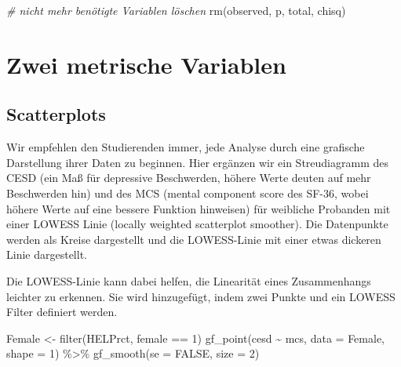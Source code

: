 \documentclass[
  ngerman,
]{scrbook}
\newenvironment{Shaded}{\begin{snugshade}}{\end{snugshade}}
\newcommand{\AttributeTok}[1]{\textcolor[rgb]{0.77,0.63,0.00}{#1}}
\newcommand{\CommentTok}[1]{\textcolor[rgb]{0.56,0.35,0.01}{\textit{#1}}}
\newcommand{\ConstantTok}[1]{\textcolor[rgb]{0.00,0.00,0.00}{#1}}
\newcommand{\DecValTok}[1]{\textcolor[rgb]{0.00,0.00,0.81}{#1}}
\newcommand{\FunctionTok}[1]{\textcolor[rgb]{0.00,0.00,0.00}{#1}}
\newcommand{\NormalTok}[1]{#1}
\newcommand{\OtherTok}[1]{\textcolor[rgb]{0.56,0.35,0.01}{#1}}
\newcommand{\SpecialCharTok}[1]{\textcolor[rgb]{0.00,0.00,0.00}{#1}}
\newenvironment{note}[1]
  {
  \begin{itemize}
  \renewcommand{\labelitemi}{
    \raisebox{-.01\height}[0pt][0pt]{
      {\setkeys{Gin}{width=7em,keepaspectratio}
        {\normalsize \textcolor{dark-fom-green}\faHashtag}}
        }
  }
  \begin{blackbox}
   \item
    }
    {
  \end{blackbox}
  \end{itemize}
  }
\begin{document}
\begin{Shaded}
\begin{Highlighting}[]
\CommentTok{\# nicht mehr benötigte Variablen löschen}
\FunctionTok{rm}\NormalTok{(observed, p, total, chisq)}
\end{Highlighting}
\end{Shaded}

\hypertarget{zweiMetrVar}{%
\chapter{Zwei metrische Variablen}\label{zweiMetrVar}}

\hypertarget{scatterplots}{%
\section{Scatterplots}\label{scatterplots}}

Wir empfehlen den Studierenden immer, jede Analyse durch eine grafische Darstellung ihrer Daten zu beginnen. Hier ergänzen wir ein Streudiagramm des CESD (ein Maß für depressive Beschwerden, höhere Werte deuten auf mehr Beschwerden hin) und des MCS (mental component score des SF-36, wobei höhere Werte auf eine bessere Funktion hinweisen) für weibliche Probanden mit einer LOWESS Linie (locally weighted scatterplot smoother). Die Datenpunkte werden als Kreise dargestellt und die LOWESS-Linie mit einer etwas dickeren Linie dargestellt.

\begin{note}{note}
Die LOWESS-Linie kann dabei helfen, die Linearität eines Zusammenhangs leichter zu erkennen. Sie wird hinzugefügt, indem zwei Punkte und ein LOWESS Filter definiert werden.

\end{note}

\begin{Shaded}
\begin{Highlighting}[]
\NormalTok{Female }\OtherTok{\textless{}{-}} \FunctionTok{filter}\NormalTok{(HELPrct, female }\SpecialCharTok{==} \DecValTok{1}\NormalTok{)}
\FunctionTok{gf\_point}\NormalTok{(cesd }\SpecialCharTok{\textasciitilde{}}\NormalTok{ mcs, }\AttributeTok{data =}\NormalTok{ Female, }\AttributeTok{shape =} \DecValTok{1}\NormalTok{) }\SpecialCharTok{\%\textgreater{}\%}
  \FunctionTok{gf\_smooth}\NormalTok{(}\AttributeTok{se =} \ConstantTok{FALSE}\NormalTok{, }\AttributeTok{size =} \DecValTok{2}\NormalTok{)}
\end{Highlighting}
\end{Shaded}
\end{document}

